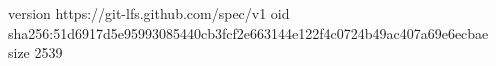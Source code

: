 version https://git-lfs.github.com/spec/v1
oid sha256:51d6917d5e95993085440cb3fcf2e663144e122f4c0724b49ac407a69e6ecbae
size 2539

